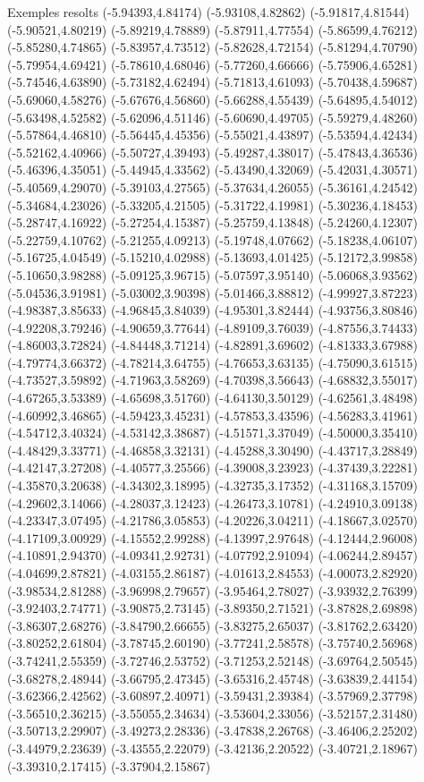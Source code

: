 \documentclass[11pt,a4paper]{article}
\begin{document}
\begin{fmex}{Exemples resolts}
(-5.94393,4.84174) (-5.93108,4.82862) (-5.91817,4.81544) (-5.90521,4.80219) (-5.89219,4.78889) (-5.87911,4.77554) (-5.86599,4.76212) (-5.85280,4.74865) (-5.83957,4.73512) (-5.82628,4.72154) (-5.81294,4.70790) (-5.79954,4.69421) (-5.78610,4.68046) (-5.77260,4.66666) (-5.75906,4.65281) (-5.74546,4.63890) (-5.73182,4.62494) (-5.71813,4.61093) (-5.70438,4.59687) (-5.69060,4.58276) (-5.67676,4.56860) (-5.66288,4.55439) (-5.64895,4.54012) (-5.63498,4.52582) (-5.62096,4.51146) (-5.60690,4.49705) (-5.59279,4.48260) (-5.57864,4.46810) (-5.56445,4.45356) (-5.55021,4.43897) (-5.53594,4.42434) (-5.52162,4.40966) (-5.50727,4.39493) (-5.49287,4.38017) (-5.47843,4.36536) (-5.46396,4.35051) (-5.44945,4.33562) (-5.43490,4.32069) (-5.42031,4.30571) (-5.40569,4.29070) (-5.39103,4.27565) (-5.37634,4.26055) (-5.36161,4.24542) (-5.34684,4.23026) (-5.33205,4.21505) (-5.31722,4.19981) (-5.30236,4.18453) (-5.28747,4.16922) (-5.27254,4.15387) (-5.25759,4.13848) (-5.24260,4.12307) (-5.22759,4.10762) (-5.21255,4.09213) (-5.19748,4.07662) (-5.18238,4.06107) (-5.16725,4.04549) (-5.15210,4.02988) (-5.13693,4.01425) (-5.12172,3.99858) (-5.10650,3.98288) (-5.09125,3.96715) (-5.07597,3.95140) (-5.06068,3.93562) (-5.04536,3.91981) (-5.03002,3.90398) (-5.01466,3.88812) (-4.99927,3.87223) (-4.98387,3.85633) (-4.96845,3.84039) (-4.95301,3.82444) (-4.93756,3.80846) (-4.92208,3.79246) (-4.90659,3.77644) (-4.89109,3.76039) (-4.87556,3.74433) (-4.86003,3.72824) (-4.84448,3.71214) (-4.82891,3.69602) (-4.81333,3.67988) (-4.79774,3.66372) (-4.78214,3.64755) (-4.76653,3.63135) (-4.75090,3.61515) (-4.73527,3.59892) (-4.71963,3.58269) (-4.70398,3.56643) (-4.68832,3.55017) (-4.67265,3.53389) (-4.65698,3.51760) (-4.64130,3.50129) (-4.62561,3.48498) (-4.60992,3.46865) (-4.59423,3.45231) (-4.57853,3.43596) (-4.56283,3.41961) (-4.54712,3.40324) (-4.53142,3.38687) (-4.51571,3.37049) (-4.50000,3.35410) (-4.48429,3.33771) (-4.46858,3.32131) (-4.45288,3.30490) (-4.43717,3.28849) (-4.42147,3.27208) (-4.40577,3.25566) (-4.39008,3.23923) (-4.37439,3.22281) (-4.35870,3.20638) (-4.34302,3.18995) (-4.32735,3.17352) (-4.31168,3.15709) (-4.29602,3.14066) (-4.28037,3.12423) (-4.26473,3.10781) (-4.24910,3.09138) (-4.23347,3.07495) (-4.21786,3.05853) (-4.20226,3.04211) (-4.18667,3.02570) (-4.17109,3.00929) (-4.15552,2.99288) (-4.13997,2.97648) (-4.12444,2.96008) (-4.10891,2.94370) (-4.09341,2.92731) (-4.07792,2.91094) (-4.06244,2.89457) (-4.04699,2.87821) (-4.03155,2.86187) (-4.01613,2.84553) (-4.00073,2.82920) (-3.98534,2.81288) (-3.96998,2.79657) (-3.95464,2.78027) (-3.93932,2.76399) (-3.92403,2.74771) (-3.90875,2.73145) (-3.89350,2.71521) (-3.87828,2.69898) (-3.86307,2.68276) (-3.84790,2.66655) (-3.83275,2.65037) (-3.81762,2.63420) (-3.80252,2.61804) (-3.78745,2.60190) (-3.77241,2.58578) (-3.75740,2.56968) (-3.74241,2.55359) (-3.72746,2.53752) (-3.71253,2.52148) (-3.69764,2.50545) (-3.68278,2.48944) (-3.66795,2.47345) (-3.65316,2.45748) (-3.63839,2.44154) (-3.62366,2.42562) (-3.60897,2.40971) (-3.59431,2.39384) (-3.57969,2.37798) (-3.56510,2.36215) (-3.55055,2.34634) (-3.53604,2.33056) (-3.52157,2.31480) (-3.50713,2.29907) (-3.49273,2.28336) (-3.47838,2.26768) (-3.46406,2.25202) (-3.44979,2.23639) (-3.43555,2.22079) (-3.42136,2.20522) (-3.40721,2.18967) (-3.39310,2.17415) (-3.37904,2.15867) 
\end{fmex}
\end{document}
